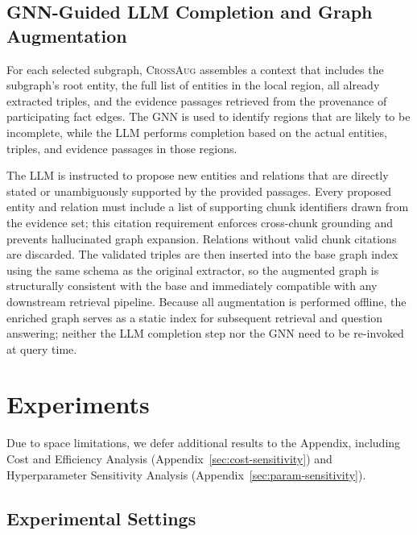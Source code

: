 \documentclass[11pt]{article}
\newcommand{\ours}{\textsc{CrossAug}\xspace}
\begin{document}
\subsection{GNN-Guided LLM Completion and Graph Augmentation}

For each selected subgraph, \ours assembles a context that includes the subgraph's root entity, the full list of entities in the local region, all already extracted triples, and the evidence passages retrieved from the provenance of participating fact edges. The GNN is used to identify regions that are likely to be incomplete, while the LLM performs completion based on the actual entities, triples, and evidence passages in those regions.

The LLM is instructed to propose new entities and relations that are directly stated or unambiguously supported by the provided passages. Every proposed entity and relation must include a list of supporting chunk identifiers drawn from the evidence set; this citation requirement enforces cross-chunk grounding and prevents hallucinated graph expansion. Relations without valid chunk citations are discarded. The validated triples are then inserted into the base graph index using the same schema as the original extractor, so the augmented graph is structurally consistent with the base and immediately compatible with any downstream retrieval pipeline. Because all augmentation is performed offline, the enriched graph serves as a static index for subsequent retrieval and question answering; neither the LLM completion step nor the GNN need to be re-invoked at query time.

\section{Experiments}
Due to space limitations, we defer additional results to the Appendix, including Cost and Efficiency Analysis (Appendix~\ref{sec:cost-sensitivity}) and Hyperparameter Sensitivity Analysis (Appendix~\ref{sec:param-sensitivity}).
\subsection{Experimental Settings}
\end{document}
